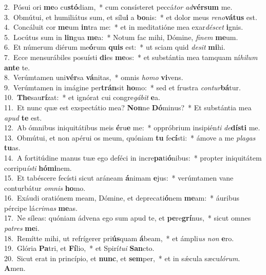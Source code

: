 {2.~}Pósui ori \textbf{me}o cu\textbf{stó}diam,~* cum consísteret peccá\textit{tor} \textit{ad}\textbf{vér}\textbf{sum} me.\\
{3.~}Obmútui, et humiliátus sum, et sílu\textbf{i} a \textbf{bo}nis:~* et dolor meus \textit{re}\textit{no}\textbf{vá}\textbf{tus} est.\\
{4.~}Concáluit cor \textbf{me}um \textbf{in}tra me:~* et in meditatióne mea exar\textit{dé}\textit{scet} \textbf{i}gnis.\\
{5.~}Locútus sum in \textbf{lin}gua \textbf{me}a:~* Notum fac mihi, Dómine, \textit{fi}\textit{nem} \textbf{me}um.\\
{6.~}Et númerum diérum me\textbf{ó}rum \textbf{quis} est:~* ut sciam quid \textit{de}\textit{sit} \textbf{mi}hi.\\
{7.~}Ecce mensurábiles posuísti \textbf{di}es \textbf{me}os:~* et substántia mea tamquam ní\textit{hi}\textit{lum} \textbf{an}\textbf{te} te.\\
{8.~}Verúmtamen uni\textbf{vér}sa \textbf{vá}nitas,~* omnis \textit{ho}\textit{mo} \textbf{vi}vens.\\
{9.~}Verúmtamen in imágine per\textbf{trán}sit \textbf{ho}mo:~* sed et frustra \textit{con}\textit{tur}\textbf{bá}tur.\\
{10.~}\textbf{The}sau\textbf{rí}zat:~* et ignórat cui congre\textit{gá}\textit{bit} \textbf{e}a.\\
{11.~}Et nunc quæ est exspectátio mea? \textbf{Non}ne \textbf{Dó}minus?~* Et substántia mea \textit{a}\textit{pud} \textbf{te} est.\\
{12.~}Ab ómnibus iniquitátibus meis \textbf{é}ru\textbf{e} me:~* oppróbrium insipién\textit{ti} \textit{de}\textbf{dí}\textbf{sti} me.\\
{13.~}Obmútui, et non apérui os meum, quóniam \textbf{tu} fe\textbf{cí}sti:~* ámove a me \textit{pla}\textit{gas} \textbf{tu}as.\\
{14.~}A fortitúdine manus tuæ ego deféci in incre\textbf{pa}ti\textbf{ó}nibus:~* propter iniquitátem corripu\textit{í}\textit{sti} \textbf{hó}\textbf{mi}nem.\\
{15.~}Et tabéscere fecísti sicut aráneam \textbf{á}nimam \textbf{e}jus:~* verúmtamen vane conturbátur \textit{om}\textit{nis} \textbf{ho}mo.\\
{16.~}Exáudi oratiónem meam, Dómine, et deprecati\textbf{ó}nem \textbf{me}am:~* áuribus pércipe lá\textit{cri}\textit{mas} \textbf{me}as.\\
{17.~}Ne síleas: quóniam ádvena ego sum apud te, et \textbf{pe}re\textbf{grí}nus,~* sicut omnes \textit{pa}\textit{tres} \textbf{me}i.\\
{18.~}Remítte mihi, ut refrígerer pri\textbf{ús}quam \textbf{á}beam,~* et ámpli\textit{us} \textit{non} \textbf{e}ro.\\
{19.~}Glória \textbf{Pa}tri, et \textbf{Fí}lio,~* et Spirí\textit{tu}\textit{i} \textbf{San}cto.\\
{20.~}Sicut erat in princípio, et \textbf{nunc}, et \textbf{sem}per,~* et in sǽcula sæcu\textit{ló}\textit{rum}. \textbf{A}men.\\
